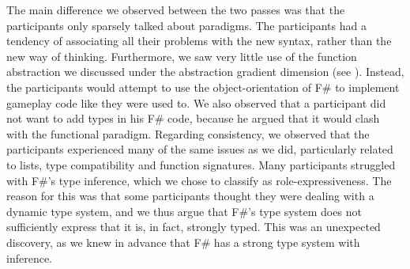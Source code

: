 The main difference we observed between the two passes was that the participants only sparsely talked about paradigms. The participants had a tendency of associating all their problems with the new syntax, rather than the new way of thinking.
Furthermore, we saw very little use of the function abstraction we discussed under the abstraction gradient dimension (see ). Instead, the participants would attempt to use the object-orientation of F\# to implement gameplay code like they were used to. We also observed that a participant did not want to add types in his F\# code, because he argued that it would clash with the functional paradigm. Regarding consistency, we observed that the participants experienced many of the same issues as we did, particularly related to lists, type compatibility and function signatures. Many participants struggled with F\#'s type inference, which we chose to classify as role-expressiveness. The reason for this was that some participants thought they were dealing with a dynamic type system, and we thus argue that F\#'s type system does not sufficiently express that it is, in fact, strongly typed. This was an unexpected discovery, as we knew in advance that F\# has a strong type system with inference.
